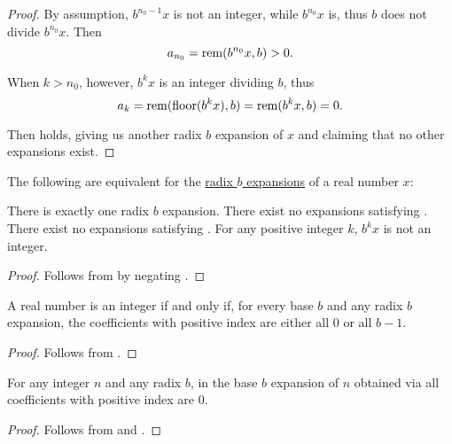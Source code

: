 \begin{proof}
  By assumption, \( b^{n_0 - 1} x \) is not an integer, while \( b^{n_0} x \) is, thus \( b \) does not divide \( b^{n_0} x \). Then
  \begin{equation*}
    a_{n_0} = \operatorname{rem}(b^{n_0} x, b) > 0.
  \end{equation*}

  When \( k > n_0 \), however, \( b^k x \) is an integer dividing \( b \), thus
  \begin{equation*}
    a_k = \operatorname{rem}(\operatorname{floor}(b^k x), b) = \operatorname{rem}(b^k x, b) = 0.
  \end{equation*}

  Then  holds, giving us another radix \( b \) expansion of \( x \) and claiming that no other expansions exist.
\end{proof}

\begin{corollary}\label{thm:radix_expansion_uniqueness}
  The following are equivalent for the \hyperref[def:real_number_radix_expansion]{radix \( b \) expansions} of a real number \( x \):
  \begin{thmenum}
     There is exactly one radix \( b \) expansion.
     There exist no expansions satisfying .
     There exist no expansions satisfying .
     For any positive integer \( k \), \( b^k x \) is not an integer.
  \end{thmenum}
\end{corollary}
\begin{proof}
  Follows from  by negating .
\end{proof}

\begin{proposition}\label{thm:integer_radix_expansion}
  A real number is an integer if and only if, for every base \( b \) and any radix \( b \) expansion, the coefficients with positive index are either all \( 0 \) or all \( b - 1 \).
\end{proposition}
\begin{proof}
  Follows from .
\end{proof}

\begin{corollary}\label{thm:integer_radix_expansion_via_algorthm}
  For any integer \( n \) and any radix \( b \), in the base \( b \) expansion of \( n \) obtained via  all coefficients with positive index are \( 0 \).
\end{corollary}
\begin{proof}
  Follows from  and .
\end{proof}

